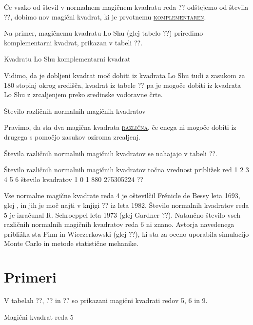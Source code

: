 \documentclass[a4paper,12pt]{article}
\newcommand{\pojem}[1]{\underline{\textsc{#1}}}
\theoremstyle{definition}
\theoremstyle{plain}
\begin{document}
   Če vsako od števil v normalnem magičnem kvadratu reda ?? odštejemo
   od števila ??, dobimo nov magični kvadrat, ki je prvotnemu
   \pojem{komplementaren}.

Na primer, magičnemu kvadratu Lo Shu (glej tabelo ??) priredimo
komplementarni kvadrat, prikazan v tabeli ??.

Kvadratu Lo Shu komplementarni kvadrat

Vidimo, da je dobljeni kvadrat moč dobiti iz kvadrata Lo Shu tudi z zasukom za
180 stopinj okrog središča, kvadrat iz tabele ?? pa je mogoče dobiti
iz kvadrata Lo Shu z zrcaljenjem preko sredinske vodoravne črte.

Število različnih normalnih magičnih kvadratov

   Pravimo, da sta dva magična kvadrata \pojem{različna}, če enega ni mogoče dobiti
   iz drugega s pomočjo zasukov oziroma zrcaljenj.

Števila različnih normalnih magičnih kvadratov se nahajajo v tabeli ??.

   Število različnih normalnih magičnih kvadratov
      točna vrednost približek
      red 1 2 3 4 5 6
      število kvadratov 1 0 1 880 275305224 ??

Vse normalne magične kvadrate reda 4 je oštevilčil Frénicle de Bessy
leta 1693, glej \cite{bessy}, in jih je moč najti v knjigi ??
iz leta 1982. Število normalnih kvadratov reda 5 je izračunal
R. Schroeppel leta 1973 (glej Gardner ??).
Natančno število vseh različnih normalnih magičnih kvadratov reda 6 ni znano.
Avtorja navedenega približka sta Pinn in Wieczerkowski (glej ??), ki
sta za oceno uporabila simulacijo Monte Carlo in metode statistične mehanike.


\section{Primeri}

V tabelah ??, ?? in ?? so prikazani
magični kvadrati redov 5, 6 in 9.

Magični kvadrat reda 5
\end{document}
